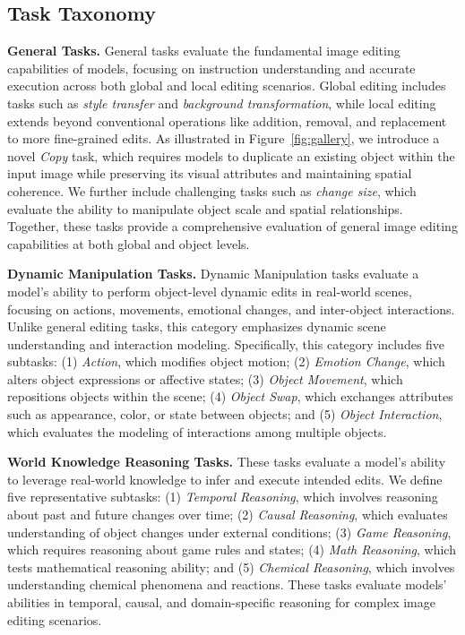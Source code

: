 \documentclass{llmxive}
\begin{document}
\subsection{Task Taxonomy}

\textbf{General Tasks.} 
General tasks evaluate the fundamental image editing capabilities of models, focusing on instruction understanding and accurate execution across both global and local editing scenarios. Global editing includes tasks such as \textit{style transfer} and \textit{background transformation}, while local editing extends beyond conventional operations like addition, removal, and replacement to more fine-grained edits.
As illustrated in Figure~\ref{fig:gallery}, we introduce a novel \textit{Copy} task, which requires models to duplicate an existing object within the input image while preserving its visual attributes and maintaining spatial coherence. We further include challenging tasks such as \textit{change size}, which evaluate the ability to manipulate object scale and spatial relationships. Together, these tasks provide a comprehensive evaluation of general image editing capabilities at both global and object levels.

\textbf{Dynamic Manipulation Tasks.}
Dynamic Manipulation tasks evaluate a model's ability to perform object-level dynamic edits in real-world scenes, focusing on actions, movements, emotional changes, and inter-object interactions. Unlike general editing tasks, this category emphasizes dynamic scene understanding and interaction modeling.
Specifically, this category includes five subtasks: (1) \textit{Action}, which modifies object motion; (2) \textit{Emotion Change}, which alters object expressions or affective states; (3) \textit{Object Movement}, which repositions objects within the scene; (4) \textit{Object Swap}, which exchanges attributes such as appearance, color, or state between objects; and (5) \textit{Object Interaction}, which evaluates the modeling of interactions among multiple objects.


\textbf{World Knowledge Reasoning Tasks.}
These tasks evaluate a model's ability to leverage real-world knowledge to infer and execute intended edits. We define five representative subtasks: (1) \textit{Temporal Reasoning}, which involves reasoning about past and future changes over time; (2) \textit{Causal Reasoning}, which evaluates understanding of object changes under external conditions; (3) \textit{Game Reasoning}, which requires reasoning about game rules and states; (4) \textit{Math Reasoning}, which tests mathematical reasoning ability; and (5) \textit{Chemical Reasoning}, which involves understanding chemical phenomena and reactions.
These tasks evaluate models' abilities in temporal, causal, and domain-specific reasoning for complex image editing scenarios.
\end{document}
